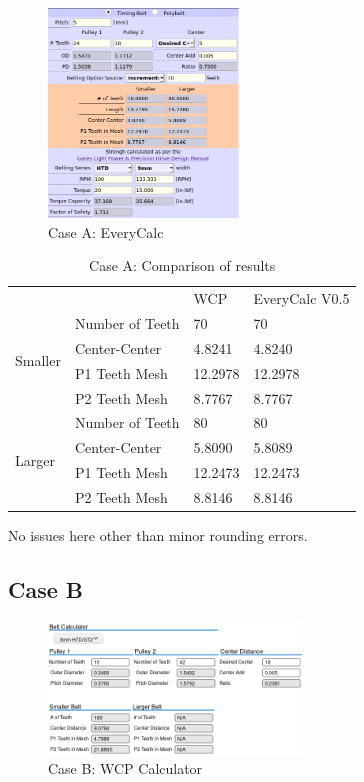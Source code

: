 \documentclass[10pt,letterpaper]{article}
\begin{document}
	\begin{figure}[H]
		\includegraphics[width=0.45\textwidth]{validation/belts_EC_A.png}
		\caption{Case A: EveryCalc}
	\end{figure}

	\begin{table}[H]
	\begin{tabular}{llll}
	                  &                 & WCP & EveryCalc V0.5 \\ \cline{1-4} 
	\multirow{4}{*}{Smaller} & Number of Teeth & 70      & 70      \\
			                 & Center-Center   & 4.8241  & 4.8240  \\
			                 & P1 Teeth Mesh   & 12.2978 & 12.2978 \\
			                 & P2 Teeth Mesh   & 8.7767  & 8.7767  \\ \cline{1-4} 
	\multirow{4}{*}{Larger}  & Number of Teeth & 80      & 80      \\
			                 & Center-Center   & 5.8090  & 5.8089  \\
			                 & P1 Teeth Mesh   & 12.2473 & 12.2473 \\
			                 & P2 Teeth Mesh   & 8.8146  & 8.8146  
	\end{tabular}
	\caption{Case A: Comparison of results}
	\end{table}

	No issues here other than minor rounding errors.

	\newpage

	\subsection*{Case B}

	\begin{figure}[H]
		\includegraphics[width=0.60\textwidth]{validation/belts_WCP_B.png}
		\caption{Case B: WCP Calculator}
	\end{figure}
\end{document}
